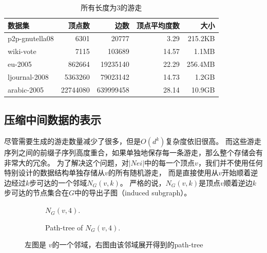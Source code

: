 \documentclass[master]{njuthesis}
\begin{document}
\begin{table}[h]
\caption{所有长度为3的游走}
\label{tab:dataset1}
\centering
\begin{tabular}{|l|r|r|r|r|}
\hline
\textbf{数据集} & \textbf{顶点数} & \textbf{边数} & \textbf{顶点平均度数} & \textbf{大小} \\
\hline
p2p-gnutella08 \footnotemark[1]  & {6301}         & \num{20777}                   & 3.29                & 215.2KB\\
\hline
wiki-vote \footnotemark[2]    & 7115 	& \num{103689}                           &14.57                & 1.1MB  \\
\hline
eu-2005       \footnotemark[3]     & \num{862664}  & \num{19235140 }          & 22.29             & 256.4MB\\
\hline
ljournal-2008  \footnotemark[4] & \num{5363260} & \num{79023142}         & 14.73            &1.2GB\\
\hline
arabic-2005 \footnotemark[5]   & \num{22744080} & \num{639999458}      & 28.14           & 10.9GB\\
\hline
\end{tabular}
\end{table}
\fi
\subsection{压缩中间数据的表示}
尽管需要生成的游走数量减少了很多，但是$O(d^k)$复杂度依旧很高。
而这些游走序列之间的前缀子序列高度重合，如果单独地保存每一条游走，那么整个存储会有非常大的冗余。
为了解决这个问题，对$|Nei|$中的每一个顶点$v$，我们并不使用任何特别设计的数据结构单独存储从$v$的所有随机游走，
而是直接使用从$v$开始顺着逆边经过$k$步可达的一个邻域$N_{G}(v, k)$。
严格的说，$N_{G}(v, k)$是顶点$v$顺着逆边$k$步可达的节点集合在$G$中的导出子图（induced subgraph）。
\begin{figure}[h]
    \centering
    \begin{subfigure}[b]{0.49\linewidth}        %
        \centering
        \label{fig:match_walks_one}
	\resizebox{!}{!}{}
	\caption{$N_G(v, 4)$.}
	
	\end{subfigure}
    \begin{subfigure}[b]{0.49\linewidth}        %
     \centering
	\resizebox{!}{!}{}
	\caption{Path-tree of $N_G(v, 4)$.}
	\label{fig:match_walks_two}
    \end{subfigure}
    \caption{左图是 $v $的一个邻域，右图由该邻域展开得到的path-tree}
    \label{fig:match_walks}
\end{figure}
\end{document}
